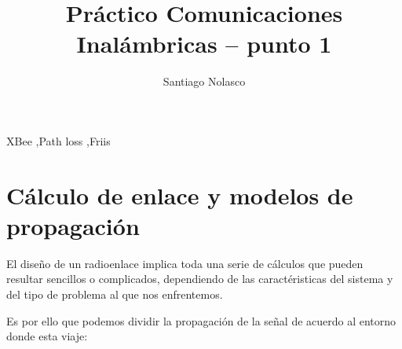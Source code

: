 \documentclass[preprint,12pt]{elsarticle}
\begin{document}
\begin{frontmatter}


\title{Pr\'actico Comunicaciones Inal\'ambricas -- punto 1}




\author{Santiago Nolasco}

\address{FI, IUA}


\begin{keyword}
XBee \sep Path loss \sep Friis


\end{keyword}

\end{frontmatter}


\section{C\'alculo de enlace y modelos de propagaci\'on}
\label{S:1}


El dise\~no de un radioenlace implica toda una serie de c\'alculos que pueden resultar sencillos o complicados, dependiendo de las caract\'eristicas del sistema y del tipo de problema al que nos enfrentemos.

Es por ello que podemos dividir la propagaci\'on de la se\~nal de acuerdo al entorno donde esta viaje: 
\end{document}
